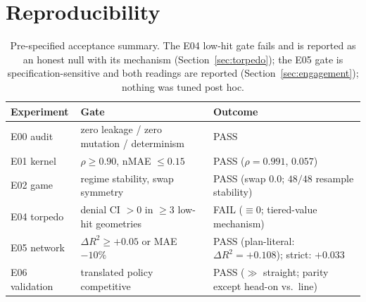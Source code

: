 \documentclass[12pt,a4paper]{article}
\begin{document}
\section{Reproducibility}\label{sec:repro}
\begin{table}[t]
\centering\small
\caption{Pre-specified acceptance summary.  The E04 low-hit gate fails
and is reported as an honest null with its mechanism
(Section~\ref{sec:torpedo}); the E05 gate is specification-sensitive and
both readings are reported (Section~\ref{sec:engagement}); nothing was
tuned post hoc.}
\label{tab:acceptance}
\begin{tabular}{p{2.6cm}p{4.6cm}p{6.2cm}}
\toprule
Experiment & Gate & Outcome \\
\midrule
E00 audit & zero leakage / zero mutation / determinism & PASS \\
E01 kernel & $\rho\ge0.90$, nMAE $\le0.15$ & PASS ($\rho=0.991$, $0.057$) \\
E02 game & regime stability, swap symmetry & PASS (swap $0.0$; $48/48$ resample stability) \\
E04 torpedo & denial CI $>0$ in $\ge3$ low-hit geometries & FAIL ($\equiv 0$; tiered-value mechanism) \\
E05 network & $\Delta R^2\ge+0.05$ or MAE $-10\%$ & PASS (plan-literal: $\Delta R^2=+0.108$); strict: $+0.033$ \\
E06 validation & translated policy competitive & PASS ($\gg$ straight; parity except head-on vs.\ line) \\
\bottomrule
\end{tabular}
\end{table}

\end{document}
